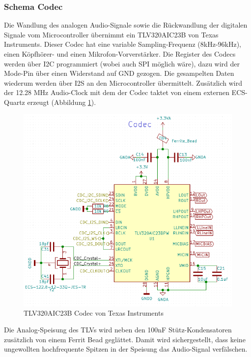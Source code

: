 \subsubsection{Schema Codec}
\label{sec:Schema_Codec}

Die Wandlung des analogen Audio-Signale sowie die Rückwandlung der digitalen Signale vom Microcontroller  übernimmt ein TLV320AIC23B von Texas Instruments. Dieser Codec hat eine variable Sampling-Frequenz (8kHz-96kHz), einen Köpfhörer- und einen Mikrofon-Vorverstärker. Die Register des Codecs werden über I2C programmiert (wobei auch SPI möglich wäre), dazu wird der Mode-Pin über einen Widerstand auf GND gezogen. Die gesampelten Daten wiederum werden über I2S an den Microcontroller übermittelt. Zusätzlich wird der 12.28 \si{MHz} Audio-Clock mit dem der Codec taktet von einem externen ECS-Quartz erzeugt (Abbildung \ref{fig:Schema_Codec}). 

\begin{figure} [H]
\begin{center}
\includegraphics[scale=0.5]{../graphics/Schema_Codec.png}
\caption{TLV320AIC23B Codec von Texas Instruments}
\label{fig:Schema_Codec}
\end{center}
\end{figure}

Die Analog-Speisung des TLVs wird neben den 100\si{nF} Stütz-Kondensatoren zusätzlich von einem Ferrit Bead geglättet. Damit wird sichergestellt, dass keine ungewollten hochfrequente Spitzen in der Speisung das Audio-Signal verfälschen.

